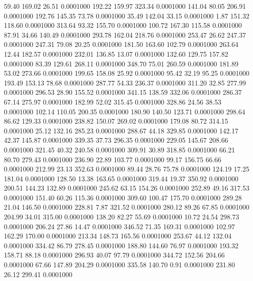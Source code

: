   59.40  169.02   26.51   0.0001000
 192.22  159.97  323.34   0.0001000
 141.04   80.05  206.91   0.0001000
 192.76  145.35   73.78   0.0001000
  35.49  142.04   33.15   0.0001000
   1.87  151.32  118.60   0.0001000
 313.64   93.32  155.70   0.0001000
 100.72  167.30  115.58   0.0001000
  87.91   34.66  140.49   0.0001000
 293.78  162.04  218.76   0.0001000
 253.47   26.62  247.37   0.0001000
 247.31   79.08   20.25   0.0001000
 181.50  163.60  102.79   0.0001000
 263.64   12.44  182.57   0.0001000
 232.01  136.85   13.07   0.0001000
 132.60  129.75  157.82   0.0001000
  83.39  129.61  268.11   0.0001000
 348.70   75.01  260.59   0.0001000
 181.89   53.02  273.66   0.0001000
 199.65  158.08   25.92   0.0001000
  95.42   32.19   95.25   0.0001000
 193.49  153.13   78.68   0.0001000
 287.77   54.33  236.37   0.0001000
 311.20   32.85  277.99   0.0001000
 296.53   28.90  155.52   0.0001000
 341.15  138.59  332.06   0.0001000
 286.37   67.14  275.97   0.0001000
 182.99   52.02  315.45   0.0001000
 328.86   24.56   38.53   0.0001000
 102.14  110.05  200.35   0.0001000
 180.90  140.50  123.71   0.0001000
 298.64   86.62  129.33   0.0001000
 238.82  150.07  269.02   0.0001000
 179.08   80.72  314.15   0.0001000
  25.12  132.16  285.23   0.0001000
 288.67   44.18  329.85   0.0001000
 142.17   42.37  145.87   0.0001000
 339.35   37.73  296.35   0.0001000
 229.05  145.67  208.66   0.0001000
 321.45   40.32  240.58   0.0001000
 309.91   30.89  318.85   0.0001000
  66.21   80.70  279.43   0.0001000
 236.90   22.89  103.77   0.0001000
  99.17  156.75   66.66   0.0001000
 212.99   23.13  352.63   0.0001000
  89.44   28.76   75.78   0.0001000
 124.19   17.25  181.04   0.0001000
 128.50   13.38  163.65   0.0001000
 319.44   19.37  350.92   0.0001000
 200.51  144.23  132.89   0.0001000
 245.62   63.15  154.26   0.0001000
 252.89   49.16  317.53   0.0001000
 151.40   60.26  115.36   0.0001000
 309.60  100.47  175.70   0.0001000
 289.28   21.04  146.50   0.0001000
 228.81    7.87  321.52   0.0001000
 280.12   89.26   67.85   0.0001000
 204.99   34.01  315.00   0.0001000
 138.20   82.27   55.69   0.0001000
  10.72   24.54  298.73   0.0001000
 206.24   27.86   14.47   0.0001000
 346.52   71.35  169.31   0.0001000
 102.97  162.29  170.00   0.0001000
 213.34  148.73  165.56   0.0001000
 253.67   44.12  132.04   0.0001000
 334.42   86.79  278.45   0.0001000
 188.80  144.60   76.97   0.0001000
 193.32  158.71   88.18   0.0001000
 296.93   40.07   97.79   0.0001000
 344.72  152.56  204.66   0.0001000
  67.66  147.89  204.29   0.0001000
 335.58  140.70    0.91   0.0001000
 231.80   26.12  299.41   0.0001000
